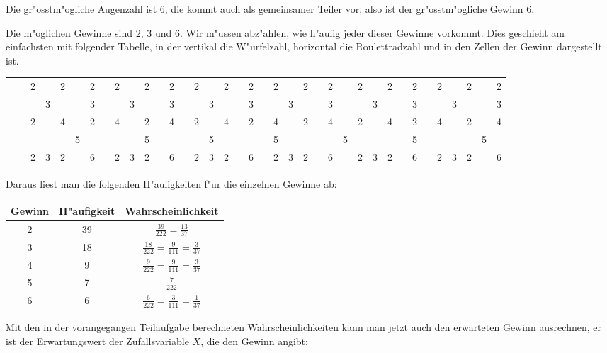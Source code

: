 \begin{loesung}
\begin{teilaufgaben}
\item
Die gr"osstm"ogliche Augenzahl ist $6$, die kommt auch als gemeinsamer
Teiler vor, also ist  der gr"osstm"ogliche Gewinn $6$.
\item
Die m"oglichen Gewinne sind $2$, $3$ und $6$. Wir m"ussen abz"ahlen,
wie h"aufig jeder dieser Gewinne vorkommt. Dies geschieht am einfachsten
mit folgender Tabelle, in der vertikal die W"urfelzahl, horizontal die
Roulettradzahl und in den Zellen der Gewinn dargestellt ist.
\begin{center}
\begin{tabular}{|c|c|c|c|c|c|c|c|c|c|c|c|c|c|c|c|c|c|c|c|c|c|c|c|c|c|c|c|c|c|c|c|c|c|c|c|c|}
\hline
&&&&&&&&&&&&&&&&&&&&&&&&&&&&&&&&&&&&\\
\hline
&&2&&2&&2&&2&&2&&2&&2&&2&&2&&2&&2&&2&&2&&2&&2&&2&&2&&2\\
\hline
&&&3&&&3&&&3&&&3&&&3&&&3&&&3&&&3&&&3&&&3&&&3&&&3\\
\hline
&&2&&4&&2&&4&&2&&4&&2&&4&&2&&4&&2&&4&&2&&4&&2&&4&&2&&4\\
\hline
&&&&&5&&&&&5&&&&&5&&&&&5&&&&&5&&&&&5&&&&&5&\\
\hline
&&2&3&2&&6&&2&3&2&&6&&2&3&2&&6&&2&3&2&&6&&2&3&2&&6&&2&3&2&&6\\
\hline
\end{tabular}
\end{center}
Daraus liest man die folgenden H"aufigkeiten f"ur die einzelnen
Gewinne ab:
\begin{center}
\begin {tabular}{|c|c|c|}
\hline
Gewinn&H"aufigkeit&Wahrscheinlichkeit\\
\hline
2&39&$\frac{39}{222}=\frac{13}{37}$\\
3&18&$\frac{18}{222}=\frac9{111}=\frac3{37}$\\
4&9&$\frac{9}{222}=\frac9{111}=\frac3{37}$\\
5&7&$\frac7{222}$\\
6&6&$\frac{6}{222}=\frac3{111}=\frac1{37}$\\
\hline
\end {tabular}
\end{center}
\item Mit den in der vorangegangen Teilaufgabe berechneten Wahrscheinlichkeiten
kann man jetzt auch den erwarteten Gewinn ausrechnen, er ist der
Erwartungswert der Zufallsvariable $X$, die den Gewinn angibt:
\begin{align*}

\end{align*}
\end{teilaufgaben}
\end{loesung}
